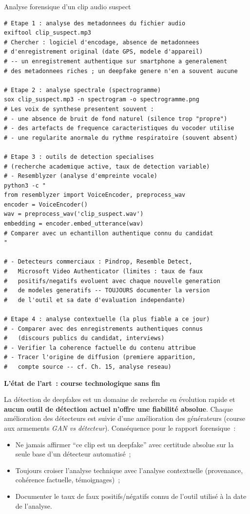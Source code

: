 \begin{boxoutils}{Analyse forensique d'un clip audio suspect}
\begin{lstlisting}[language=bash_forensique]
# Etape 1 : analyse des metadonnees du fichier audio
exiftool clip_suspect.mp3
# Chercher : logiciel d'encodage, absence de metadonnees
# d'enregistrement original (date GPS, modele d'appareil)
# -- un enregistrement authentique sur smartphone a generalement
# des metadonnees riches ; un deepfake genere n'en a souvent aucune

# Etape 2 : analyse spectrale (spectrogramme)
sox clip_suspect.mp3 -n spectrogram -o spectrogramme.png
# Les voix de synthese presentent souvent :
# - une absence de bruit de fond naturel (silence trop "propre")
# - des artefacts de frequence caracteristiques du vocoder utilise
# - une regularite anormale du rythme respiratoire (souvent absent)

# Etape 3 : outils de detection specialises
# (recherche academique active, taux de detection variable)
# - Resemblyzer (analyse d'empreinte vocale)
python3 -c "
from resemblyzer import VoiceEncoder, preprocess_wav
encoder = VoiceEncoder()
wav = preprocess_wav('clip_suspect.wav')
embedding = encoder.embed_utterance(wav)
# Comparer avec un echantillon authentique connu du candidat
"

# - Detecteurs commerciaux : Pindrop, Resemble Detect,
#   Microsoft Video Authenticator (limites : taux de faux
#   positifs/negatifs evoluent avec chaque nouvelle generation
#   de modeles generatifs -- TOUJOURS documenter la version
#   de l'outil et sa date d'evaluation independante)

# Etape 4 : analyse contextuelle (la plus fiable a ce jour)
# - Comparer avec des enregistrements authentiques connus
#   (discours publics du candidat, interviews)
# - Verifier la coherence factuelle du contenu attribue
# - Tracer l'origine de diffusion (premiere apparition,
#   compte source -- cf. Ch. 15, analyse reseau)
\end{lstlisting}
\end{boxoutils}

\begin{boxalert}
\textbf{L'état de l'art~: course technologique sans fin}

La détection de deepfakes est un domaine de recherche en évolution
rapide et \textbf{aucun outil de détection actuel n'offre une
fiabilité absolue}. Chaque amélioration des détecteurs est suivie
d'une amélioration des générateurs (course aux armements
\textit{GAN vs détecteur}). Conséquence pour le rapport forensique~:
\begin{itemize}
    \item Ne jamais affirmer ``ce clip est un deepfake'' avec
          certitude absolue sur la seule base d'un détecteur
          automatisé~;
    \item Toujours croiser l'analyse technique avec l'analyse
          contextuelle (provenance, cohérence factuelle, témoignages)~;
    \item Documenter le taux de faux positifs/négatifs connu
          de l'outil utilisé à la date de l'analyse.
\end{itemize}
\end{boxalert}

